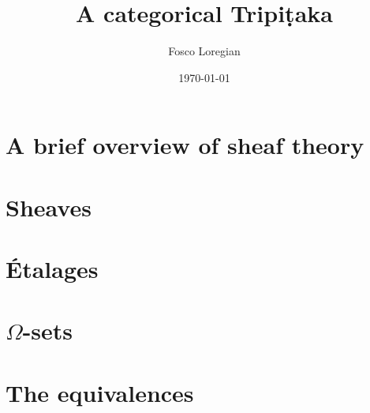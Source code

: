 \documentclass{amsart}
\author{Fosco Loregian}
\title{A categorical Tripi\d{t}aka}
\date{\today}
\begin{document}
\maketitle
\section{A brief overview of sheaf theory}

\section{Sheaves}
\begin{definition}[Sheaf]
  
\end{definition}
\section{\'Etalages}

\section{$\Omega$-sets}

\section{The equivalences}
\end{document}
